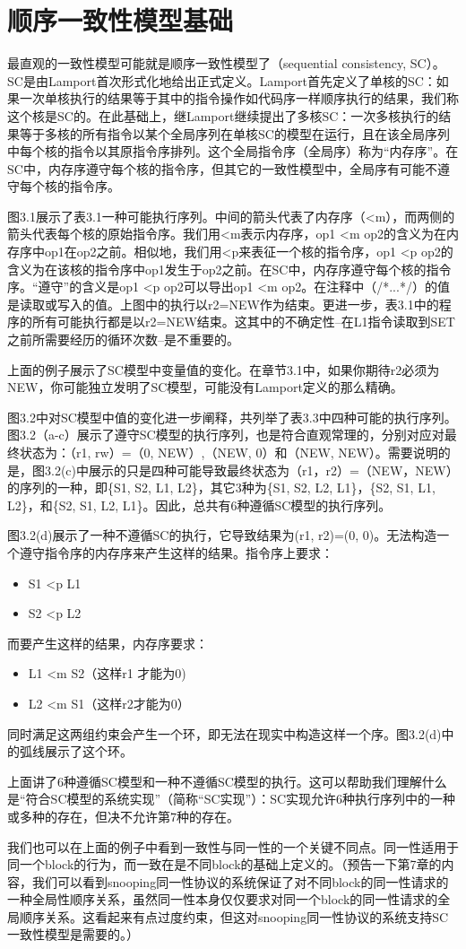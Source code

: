 \documentclass[UTF-8]{ctexrep}
\begin{document}
\section{顺序一致性模型基础}
最直观的一致性模型可能就是顺序一致性模型了（sequential consistency, SC）。SC是由Lamport首次形式化地给出正式定义。Lamport首先定义了单核的SC：如果一次单核执行的结果等于其中的指令操作如代码序一样顺序执行的结果，我们称这个核是SC的。在此基础上，继Lamport继续提出了多核SC：一次多核执行的结果等于多核的所有指令以某个全局序列在单核SC的模型在运行，且在该全局序列中每个核的指令以其原指令序排列。这个全局指令序（全局序）称为“内存序”。在SC中，内存序遵守每个核的指令序，但其它的一致性模型中，全局序有可能不遵守每个核的指令序。
\par 图3.1展示了表3.1一种可能执行序列。中间的箭头代表了内存序（<m），而两侧的箭头代表每个核的原始指令序。我们用<m表示内存序，op1 <m op2的含义为在内存序中op1在op2之前。相似地，我们用<p来表征一个核的指令序，op1 <p op2的含义为在该核的指令序中op1发生于op2之前。在SC中，内存序遵守每个核的指令序。“遵守”的含义是op1 <p op2可以导出op1 <m op2。在注释中（/*...*/）的值是读取或写入的值。上图中的执行以r2=NEW作为结束。更进一步，表3.1中的程序的所有可能执行都是以r2=NEW结束。这其中的不确定性--在L1指令读取到SET之前所需要经历的循环次数--是不重要的。
\par 上面的例子展示了SC模型中变量值的变化。在章节3.1中，如果你期待r2必须为NEW，你可能独立发明了SC模型，可能没有Lamport定义的那么精确。
\par 图3.2中对SC模型中值的变化进一步阐释，共列举了表3.3中四种可能的执行序列。图3.2（a-c）展示了遵守SC模型的执行序列，也是符合直观常理的，分别对应对最终状态为：（r1, rw）=（0, NEW）,（NEW, 0）和（NEW, NEW）。需要说明的是，图3.2(c)中展示的只是四种可能导致最终状态为（r1，r2）=（NEW，NEW）的序列的一种，即\{S1, S2, L1, L2\}，其它3种为\{S1, S2, L2, L1\}，\{S2, S1, L1, L2\}，和\{S2, S1, L2, L1\}。因此，总共有6种遵循SC模型的执行序列。
\par 图3.2(d)展示了一种不遵循SC的执行，它导致结果为(r1, r2)=(0, 0)。无法构造一个遵守指令序的内存序来产生这样的结果。指令序上要求：
\begin{itemize}
\item S1 <p L1
\item S2 <p L2
\end{itemize}
而要产生这样的结果，内存序要求：
\begin{itemize}
\item L1 <m S2（这样r1 才能为0)
\item L2 <m S1（这样r2才能为0）
\end{itemize}
同时满足这两组约束会产生一个环，即无法在现实中构造这样一个序。图3.2(d)中的弧线展示了这个环。
\par 上面讲了6种遵循SC模型和一种不遵循SC模型的执行。这可以帮助我们理解什么是“符合SC模型的系统实现”（简称“SC实现”）：SC实现允许6种执行序列中的一种或多种的存在，但决不允许第7种的存在。
\par 我们也可以在上面的例子中看到一致性与同一性的一个关键不同点。同一性适用于同一个block的行为，而一致在是不同block的基础上定义的。（预告一下第7章的内容，我们可以看到snooping同一性协议的系统保证了对不同block的同一性请求的一种全局性顺序关系，虽然同一性本身仅仅要求对同一个block的同一性请求的全局顺序关系。这看起来有点过度约束，但这对snooping同一性协议的系统支持SC一致性模型是需要的。）
\end{document}
